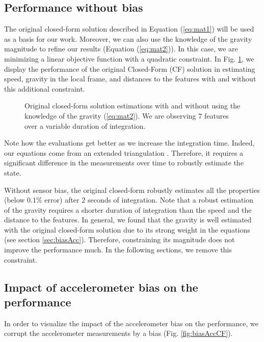 \documentclass[letterpaper, 10 pt, journal, twoside]{IEEEtran}  %
\begin{document}
\subsection{Performance without bias}

The original closed-form solution described in Equation (\ref{eq:mat1}) will be used as a basis for our work.
Moreover, we can also use the knowledge of the gravity magnitude to refine our results (Equation (\ref{eq:mat2})).
In this case, we are minimizing a linear objective function with a quadratic constraint.
In Fig. \ref{fig:original}, we display the performance of the original Closed-Form (CF) solution in estimating speed, gravity in the local frame, and distances to the features with and without this additional constraint.

\begin{figure}[h!]
  \centering
    \resizebox{0.95\columnwidth}{!}{}
    \caption{Original closed-form solution estimations with and without using the knowledge of the gravity (\ref{eq:mat2}). We are observing 7 features  over a variable duration of integration.\label{fig:original}}
\end{figure}

Note how the evaluations get better as we increase the integration time.
Indeed, our equations come from an extended triangulation \cite{Martinelli2012}.
Therefore, it requires a significant difference in the measurements over time to robustly estimate the state.


Without sensor bias, the original closed-form robustly estimates all the properties (below $0.1\%$ error) after $2$ seconds of integration.
Note that a robust estimation of the gravity requires a shorter duration of integration than the speed and the distance to the features.
In general, we found that the gravity is well estimated with the original closed-form solution due to its strong weight in the equations (see section \ref{sec:biasAcc}).
Therefore, constraining its magnitude does not improve the performance much.
In the following sections, we remove this constraint.



\subsection{Impact of accelerometer bias on the performance \label{sec:biasAcc}}
In order to visualize the impact of the accelerometer bias on the performance,
we corrupt the accelerometer measurements by a bias (Fig. \ref{fig:biasAccCF}).
\end{document}
